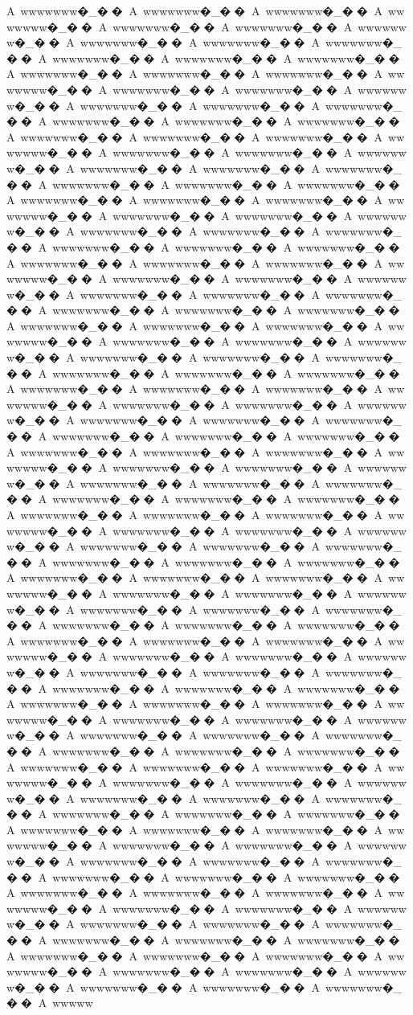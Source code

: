 {{{{{{{{{{{{{{{{{{{{{{{{{{{{{{{{{{{{{{{{{{{{{{{{{A~wwwwwww�_��A~wwwwwww�_��A~wwwwwww�_��A~wwwwwww�_��A~wwwwwww�_��A~wwwwwww�_��A~wwwwwww�_��A~wwwwwww�_��A~wwwwwww�_��A~wwwwwww�_��A~wwwwwww�_��A~wwwwwww�_��A~wwwwwww�_��A~wwwwwww�_��A~wwwwwww�_��A~wwwwwww�_��A~wwwwwww�_��A~wwwwwww�_��A~wwwwwww�_��A~wwwwwww�_��A~wwwwwww�_��A~wwwwwww�_��A~wwwwwww�_��A~wwwwwww�_��A~wwwwwww�_��A~wwwwwww�_��A~wwwwwww�_��A~wwwwwww�_��A~wwwwwww�_��A~wwwwwww�_��A~wwwwwww�_��A~wwwwwww�_��A~wwwwwww�_��A~wwwwwww�_��A~wwwwwww�_��A~wwwwwww�_��A~wwwwwww�_��A~wwwwwww�_��A~wwwwwww�_��A~wwwwwww�_��A~wwwwwww�_��A~wwwwwww�_��A~wwwwwww�_��A~wwwwwww�_��A~wwwwwww�_��A~wwwwwww�_��A~wwwwwww�_��A~wwwwwww�_��A~wwwwwww�_��A~wwwwwww�_��A~wwwwwww�_��A~wwwwwww�_��A~wwwwwww�_��A~wwwwwww�_��A~wwwwwww�_��A~wwwwwww�_��A~wwwwwww�_��A~wwwwwww�_��A~wwwwwww�_��A~wwwwwww�_��A~wwwwwww�_��A~wwwwwww�_��A~wwwwwww�_��A~wwwwwww�_��A~wwwwwww�_��A~wwwwwww�_��A~wwwwwww�_��A~wwwwwww�_��A~wwwwwww�_��A~wwwwwww�_��A~wwwwwww�_��A~wwwwwww�_��A~wwwwwww�_��A~wwwwwww�_��A~wwwwwww�_��A~wwwwwww�_��A~wwwwwww�_��A~wwwwwww�_��A~wwwwwww�_��A~wwwwwww�_��A~wwwwwww�_��A~wwwwwww�_��A~wwwwwww�_��A~wwwwwww�_��A~wwwwwww�_��A~wwwwwww�_��A~wwwwwww�_��A~wwwwwww�_��A~wwwwwww�_��A~wwwwwww�_��A~wwwwwww�_��A~wwwwwww�_��A~wwwwwww�_��A~wwwwwww�_��A~wwwwwww�_��A~wwwwwww�_��A~wwwwwww�_��A~wwwwwww�_��A~wwwwwww�_��A~wwwwwww�_��A~wwwwwww�_��A~wwwwwww�_��A~wwwwwww�_��A~wwwwwww�_��A~wwwwwww�_��A~wwwwwww�_��A~wwwwwww�_��A~wwwwwww�_��A~wwwwwww�_��A~wwwwwww�_��A~wwwwwww�_��A~wwwwwww�_��A~wwwwwww�_��A~wwwwwww�_��A~wwwwwww�_��A~wwwwwww�_��A~wwwwwww�_��A~wwwwwww�_��A~wwwwwww�_��A~wwwwwww�_��A~wwwwwww�_��A~wwwwwww�_��A~wwwwwww�_��A~wwwwwww�_��A~wwwwwww�_��A~wwwwwww�_��A~wwwwwww�_��A~wwwwwww�_��A~wwwwwww�_��A~wwwwwww�_��A~wwwwwww�_��A~wwwwwww�_��A~wwwwwww�_��A~wwwwwww�_��A~wwwwwww�_��A~wwwwwww�_��A~wwwwwww�_��A~wwwwwww�_��A~wwwwwww�_��A~wwwwwww�_��A~wwwwwww�_��A~wwwwwww�_��A~wwwwwww�_��A~wwwwwww�_��A~wwwwwww�_��A~wwwwwww�_��A~wwwwwww�_��A~wwwwwww�_��A~wwwwwww�_��A~wwwwwww�_��A~wwwwwww�_��A~wwwwwww�_��A~wwwwwww�_��A~wwwwwww�_��A~wwwwwww�_��A~wwwwwww�_��A~wwwwwww�_��A~wwwwwww�_��A~wwwwwww�_��A~wwwwwww�_��A~wwwwwww�_��A~wwwwwww�_��A~wwwwwww�_��A~wwwwwww�_��A~wwwwwww�_��A~wwwwwww�_��A~wwwwwww�_��A~wwwwwww�_��A~wwwwwww�_��A~wwwwwww�_��A~wwwwwww�_��A~wwwwwww�_��A~wwwwwww�_��A~wwwwwww�_��A~wwwwwww�_��A~wwwwwww�_��A~wwwwwww�_��A~wwwwwww�_��A~wwwwwww�_��A~wwwwwww�_��A~wwwwwww�_��A~wwwwwww�_��A~wwwwwww�_��A~wwwwwww�_��A~wwwwwww�_��A~wwwwwww�_��A~wwwwwww�_��A~wwwwwww�_��A~wwwwwww�_��A~wwwwwww�_��A~wwwwwww�_��A~wwwwwww�_��A~wwwwwww�_��A~wwwwwww�_��A~wwwwwww�_��A~wwwwwww�_��A~wwwwwww�_��A~wwwwwww�_��A~wwwwwww�_��A~wwwwwww�_��A~wwwwwww�_��A~wwwwwww�_��A~wwwwwww�_��A~wwwwwww�_��A~wwwwwww�_��A~wwwww}}}}}}}}}}}}}}}}}}}}}}}}}}}}}}}}}}}}}}}}}}}}}}}}}
